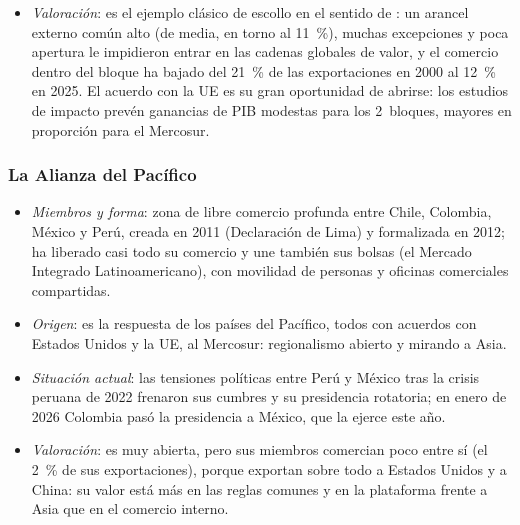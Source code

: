 \documentclass[11pt]{article}
\begin{document}
\begin{itemize}
\begin{itemize}
  \item con la AELC, firmado en 2025 y en vigor para Brasil desde octubre de 2026; y negocia con Canadá y con los Emiratos Árabes Unidos\nocite{AELC2026Mercosur};
  \item su debate interno es la \emph{flexibilización}: Uruguay (que ha pedido entrar en el CPTPP) y Argentina quieren poder firmar acuerdos por su cuenta, lo que es incompatible con una unión aduanera.
  \end{itemize}
\item \emph{Valoración}: es el ejemplo clásico de escollo en el sentido de : un arancel externo común alto (de media, en torno al 11~\%), muchas excepciones y poca apertura le impidieron entrar en las cadenas globales de valor, y el comercio dentro del bloque ha bajado del 21~\% de las exportaciones en 2000 al 12~\% en 2025\nocite{FMI2026IMTS}. El acuerdo con la UE es su gran oportunidad de abrirse: los estudios de impacto prevén ganancias de PIB modestas para los 2~bloques, mayores en proporción para el Mercosur\nocite{CE2025MercosurAnalisis,LSE2020SIAMercosur}.
\end{itemize}

\subsubsection{La Alianza del Pacífico}\label{sec:alianza}

\begin{itemize}
\item \emph{Miembros y forma}: zona de libre comercio profunda entre Chile, Colombia, México y Perú, creada en 2011 (Declaración de Lima) y formalizada en 2012; ha liberado casi todo su comercio y une también sus bolsas (el Mercado Integrado Latinoamericano), con movilidad de personas y oficinas comerciales compartidas.
\item \emph{Origen}: es la respuesta de los países del Pacífico, todos con acuerdos con Estados Unidos y la UE, al Mercosur: regionalismo abierto y mirando a Asia.
\item \emph{Situación actual}: las tensiones políticas entre Perú y México tras la crisis peruana de 2022 frenaron sus cumbres y su presidencia rotatoria; en enero de 2026 Colombia pasó la presidencia a México, que la ejerce este año\nocite{Cancilleria2026Alianza}.
\item \emph{Valoración}: es muy abierta, pero sus miembros comercian poco entre sí (el 2~\% de sus exportaciones), porque exportan sobre todo a Estados Unidos y a China: su valor está más en las reglas comunes y en la plataforma frente a Asia que en el comercio interno.
\end{itemize}
\end{document}

